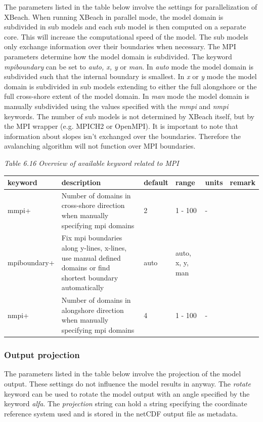 \documentclass{article}
\begin{document}
\noindent The parameters listed in the table below involve the settings for parallelization of XBeach. When running XBeach in parallel mode, the model domain is subdivided in sub models and each sub model is then computed on a separate core. This will increase the computational speed of the model. The sub models only exchange information over their boundaries when necessary. The MPI parameters determine how the model domain is subdivided. The keyword \textit{mpiboundary} can be set to \textit{auto, x, y }or \textit{man}. In \textit{auto} mode the model domain is subdivided such that the internal boundary is smallest. In \textit{x} or \textit{y} mode the model domain is subdivided in sub models extending to either the full alongshore or the full cross-shore extent of the model domain. In \textit{man} mode the model domain is manually subdivided using the values specified with the \textit{mmpi} and \textit{nmpi} keywords. The number of sub models is not determined by XBeach itself, but by the MPI wrapper (e.g. MPICH2 or OpenMPI). It is important to note that information about slopes isn't exchanged over the boundaries. Therefore the avalanching algorithm will not function over MPI boundaries.

\noindent \textit{Table 6.16 Overview of available keyword related to MPI}

\begin{tabular}{|p{0.8in}|p{1.1in}|p{0.6in}|p{0.6in}|p{0.4in}|p{0.6in}|} \hline 
keyword & description & default & range & units & remark \\ \hline 
mmpi+ & Number of domains in cross-shore direction when manually specifying mpi domains & 2 & 1 - 100 & - &  \\ \hline 
mpiboundary+ & Fix mpi boundaries along y-lines, x-lines, use manual defined domains or find shortest boundary automatically & auto & auto, x, y, man &  &  \\ \hline 
nmpi+ & Number of domains in alongshore direction when manually specifying mpi domains & 4 & 1 - 100 & - &  \\ \hline 
\end{tabular}


\subsubsection{ Output projection}

\noindent The parameters listed in the table below involve the projection of the model output. These settings do not influence the model results in anyway. The \textit{rotate} keyword can be used to rotate the model output with an angle specified by the keyword \textit{alfa}. The \textit{projection} string can hold a string specifying the coordinate reference system used and is stored in the netCDF output file as metadata.
\end{document}
